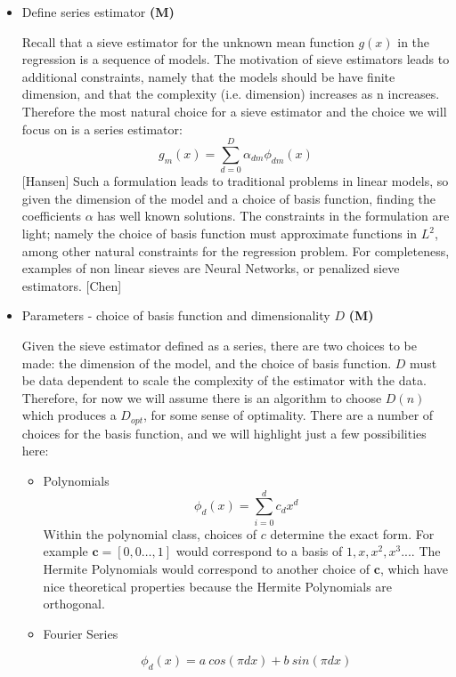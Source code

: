 \documentclass[12pt]{article}  %
\begin{document}
\begin{itemize}
\item Define series estimator \textbf{(M)}

Recall that a sieve estimator for the unknown mean function $g(x)$ in the regression is a sequence of models. The motivation of sieve estimators leads to additional constraints, namely that the models should be have finite dimension, and that the complexity (i.e. dimension) increases as n increases.  Therefore the most natural choice for a sieve estimator and the choice we will focus on is a series estimator: 
$$ g_m(x) = \sum_{d=0}^{D} \alpha_{dm} \phi_{dm}(x)$$  [Hansen]
Such a formulation leads to traditional problems in linear models, so given the dimension of  the model and a choice of basis function, finding the coefficients $\alpha$ has well known solutions.  The constraints in the formulation are light; namely the choice of basis function must approximate functions in $L^2$, among other natural constraints for the regression problem.  For completeness, examples of non linear sieves are Neural Networks, or penalized sieve estimators.  [Chen]



\item Parameters - choice of basis function and dimensionality $D$ \textbf{(M)}

Given the sieve estimator defined as a series, there are two choices to be made: the dimension of the model, and the choice of basis function.  $D$ must be data dependent to scale the complexity of the estimator with the data. Therefore, for now we will assume there is an algorithm to choose $D(n)$ which produces a $D_{opt}$, for some sense of optimality. There are a number of choices for the basis function, and we will highlight just a few possibilities here: 

\begin{itemize}
\item Polynomials $$ \phi_d(x) = \sum_{i=0}^{d} c_d x^d$$
Within the polynomial class, choices of $c$ determine the exact form. For example $\textbf{c} = [0,0 \ldots, 1]$ would correspond to a basis of $1,x,x^2,x^3...$. The Hermite Polynomials would correspond to another choice of $\textbf{c}$, which have nice theoretical properties because the Hermite Polynomials are orthogonal.

\item Fourier Series

$$ \phi_d(x) = a~cos(\pi d x) + b~sin(\pi d x)$$


\end{itemize}
\end{itemize}
\end{document}
